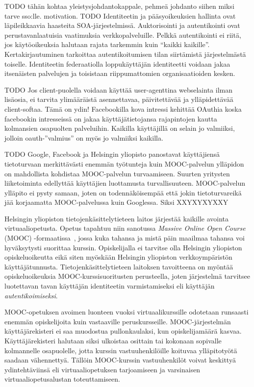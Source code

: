 \documentclass[finnish,gradu]{tktltiki}
\begin{document}
  TODO tähän kohtaa yleistysjohdantokappale, pehmeä johdanto siihen miksi tarve sso:lle. motivation.
  TODO
  Identiteetin ja pääsyoikeuksien hallinta ovat läpileikkaavia haasteita SOA-järjestelmissä.
  Auktorisointi ja autentikointi ovat perustavanlaatuisia vaatimuksia verkkopalveluille. Pelkkä autentikointi ei riitä, jos käytöoikeuksia halutaan rajata tarkemmin kuin ``kaikki kaikille''. Kertakirjautuminen tarkoittaa autentikoitumisen tilan siirtämistä järjestelmästä toiselle. Identiteetin federaatiolla loppukäyttäjän identiteetti voidaan jakaa itsenäisten palvelujen ja toisistaan riippumattomien organisaatioiden kesken.

  TODO
  Jos client-puolella voidaan käyttää user-agenttina webselainta ilman lisäosia, ei tarvita ylimääräistä asennettavaa, päivitettävää ja ylläpidettävää client-softaa. Tämä on ydin! Facebookilla kova intressi kehittää OAuthia koska facebookin intresseissä on jakaa käyttäjätietojansa rajapintojen kautta kolmansien osapuolten palveluihin. Kaikilla käyttäjillä on selain jo valmiiksi, jolloin oauth-''valmius'' on myös jo valmiiksi kaikilla.

  TODO
    Google, Facebook ja Helsingin yliopisto panostavat käyttäjiensä tietoturvaan merkittävästi enemmän työtunteja kuin MOOC-palvelun ylläpidon on mahdollista kohdistaa MOOC-palvelun turvaamiseen. Suurten yritysten liiketoiminta edellyttää käyttäjien luottamusta turvallisuuteen. MOOC-palvelun ylläpito ei pysty samaan, joten on todennäköisempää että jokin tietoturvareikä jää korjaamatta MOOC-palvelussa kuin Googlessa. Siksi XXYXYXYXXY

  Helsingin yliopiston tietojenkäsittelytieteen laitos järjestää kaikille avointa virtuaaliopetusta. Opetus tapahtuu niin sanotussa \emph{Massive Online Open Course} (MOOC) -formaatissa~\cite{chamberlin_mooc_2011}, jossa kuka tahansa ja mistä päin maailmaa tahansa voi hyväksytysti suorittaa kurssin. Opiskelijalla ei tarvitse olla Helsingin yliopiston opiskeluoikeutta eikä siten myöskään Helsingin yliopiston verkkoympäristön käyttäjätunnusta. Tietojenkäsittelytieteen laitoksen tavoitteena on myöntää opiskeluoikeuksia MOOC-kurssisuoritusten perusteella, joten järjestelmä tarvitsee luotettavan tavan käyttäjän identiteetin varmistamiseksi eli käyttäjän \emph{autentikoimiseksi}.

  MOOC-opetuksen avoimen luonteen vuoksi virtuaalikurssille odotetaan runsaasti enemmän opiskelijoita kuin vastaaville peruskursseille. MOOC-järjestelmän käyttäjärekisteri ei saa muodostua pullonkaulaksi, kun opiskelijamäärä kasvaa. Käyttäjärekisteri halutaan siksi ulkoistaa osittain tai kokonaan sopivalle kolmannelle osapuolelle, jotta kurssin vastuuhenkilöille koituvaa ylläpitotyötä saadaan vähennettyä. Tällöin MOOC-kurssin vastuuhenkilöt voivat keskittyä ydintehtäviinsä eli virtuaaliopetuksen tarjoamiseen ja varsinaisen virtuaaliopetusalustan toteuttamiseen.
\end{document}
